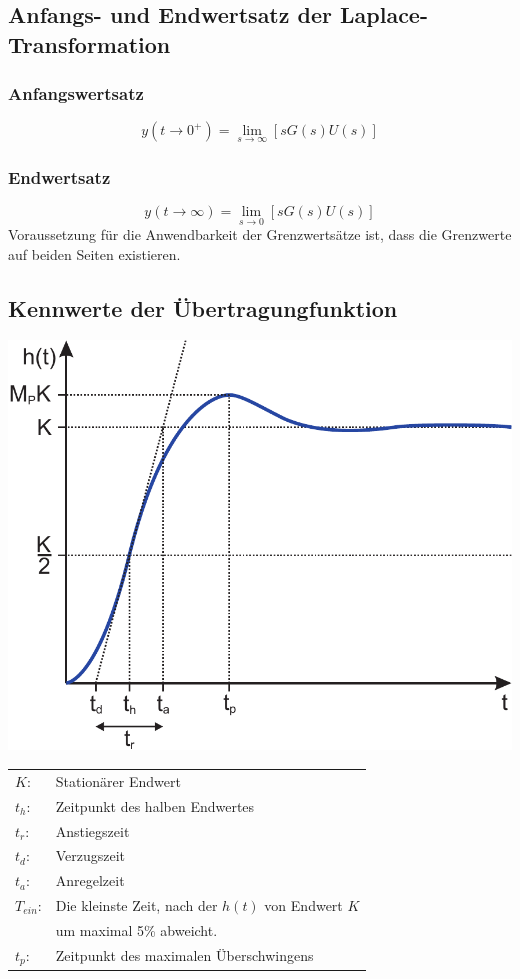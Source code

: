 \documentclass[a4paper,twocolumn,10pt]{article}
\begin{document}
\subsection{Anfangs- und Endwertsatz der Laplace-Transformation}

\subsubsection{Anfangswertsatz}
\begin{equation*}
y(t\rightarrow 0^+)=\lim\limits_{s\rightarrow\infty}[sG(s)U(s)]
\end{equation*}

\subsubsection{Endwertsatz}
\begin{equation*}
y(t\rightarrow\infty)=\lim\limits_{s\rightarrow 0}[sG(s)U(s)]
\end{equation*}
Voraussetzung für die Anwendbarkeit der Grenzwertsätze ist, dass die Grenzwerte auf beiden Seiten existieren.

\subsection{Kennwerte der Übertragungfunktion}
\begin{center}
\includegraphics[width=0.95\columnwidth]{Grafiken/Kennwerte_Uebertragungsfunktion}
\end{center}
\begin{tabular}{ll}
$K$: & Stationärer Endwert\\
$t_h$: & Zeitpunkt des halben Endwertes\\
$t_r$: & Anstiegszeit\\
$t_d$: & Verzugszeit\\
$t_a$: & Anregelzeit\\
$T_{ein}$: & Die kleinste Zeit, nach der $h(t)$ von Endwert $K$\\
& um maximal 5\% abweicht.\\
$t_p$: & Zeitpunkt des maximalen Überschwingens
\end{tabular}
\end{document}
